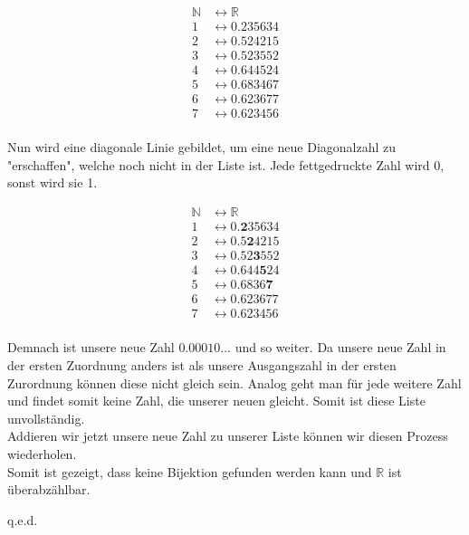\documentclass[smallheadings,headsepline,12pt,a4paper]{scrartcl}
\begin{document}
\begin{equation} 
 \begin{aligned} 
  \mathbb{N} &\leftrightarrow \mathbb{R} \\ 
     1 &\leftrightarrow 0.235634\\ 
     2 &\leftrightarrow 0.524215\\
     3&\leftrightarrow  0.523552\\
     4&\leftrightarrow  0.644524\\
     5&\leftrightarrow  0.683467\\
     6&\leftrightarrow  0.623677\\
     7&\leftrightarrow  0.623456\\
 \end{aligned} 
\end{equation}

Nun wird eine diagonale Linie gebildet, um eine neue Diagonalzahl zu "erschaffen", welche noch nicht in der Liste ist. Jede fettgedruckte Zahl wird 0, sonst wird sie 1. 

\begin{equation} 
 \begin{aligned} 
  \mathbb{N} &\leftrightarrow \mathbb{R} \\ 
     1 &\leftrightarrow 0.\textbf{2}35634\\ 
     2 &\leftrightarrow 0.5\textbf{2}4215\\
     3&\leftrightarrow  0.52\textbf{3}552\\
     4&\leftrightarrow  0.644\textbf{5}24\\
     5&\leftrightarrow  0.6836\textbf{7}\\
     6&\leftrightarrow  0.623677\\
     7&\leftrightarrow  0.623456\\
 \end{aligned} 
\end{equation}

\newpage


Demnach ist unsere neue Zahl $ 0.00010... $ und so weiter. Da unsere neue Zahl in der ersten Zuordnung anders ist als unsere Ausgangszahl in der ersten Zurordnung können diese nicht gleich sein. Analog geht man für jede weitere Zahl und findet somit keine Zahl, die unserer neuen gleicht. Somit ist diese Liste unvollständig. \\
Addieren wir jetzt unsere neue Zahl zu unserer Liste können wir diesen Prozess wiederholen. \\
Somit ist gezeigt, dass keine Bijektion gefunden werden kann und $ \mathbb{R} $ ist überabzählbar. 
\begin{flushright}
q.e.d.
\end{flushright}
\end{document}
